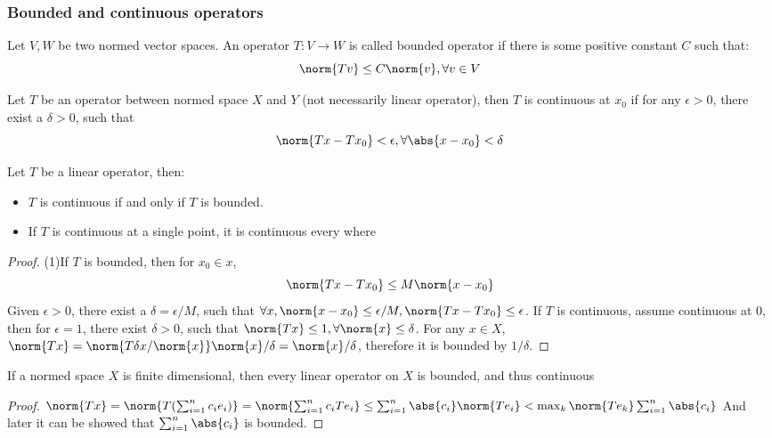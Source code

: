\begin{refsection}
\subsubsection{Bounded and continuous operators}
\begin{definition}
Let $V,W$ be two normed vector spaces. An operator $T: V\rightarrow W$ is called bounded operator if there is some positive constant $C$ such that:
$$\norm{Tv} \leq C\norm{v},\forall v\in V$$
\end{definition}


\begin{definition}
Let $T$ be an operator between normed space $X$ and $Y$ (not necessarily linear operator), then $T$ is continuous at $x_0$ if for any $\epsilon > 0$, there exist a $\delta > 0$, such that 
$$\norm{Tx - Tx_0} < \epsilon, \forall \abs{x-x_0} <\delta$$
\end{definition}

\begin{theorem}
Let $T$ be a linear operator, then:
\begin{itemize}
    \item $T$ is continuous if and only if $T$ is bounded.
    \item If $T$ is continuous at a single point, it is continuous every where
\end{itemize}
\end{theorem}
\begin{proof}
(1)If $T$ is bounded, then for $x_0 \in x$, $$\norm{Tx-Tx_0} \leq M\norm{x-x_0}$$ Given $\epsilon > 0$, there exist a $\delta = \epsilon/M$, such that $\forall x, \norm{x-x_0} \leq \epsilon/M, \norm{Tx-Tx_0} \leq \epsilon$. If $T$ is continuous, assume continuous at $0$, then for $\epsilon = 1$, there exist $\delta > 0$, such that $\norm{Tx}\leq 1,\forall \norm{x}\leq \delta$. For any $x \in X$, $\norm{Tx} = \norm{T \delta x/\norm{x}} \norm{x}/\delta = \norm{x}/\delta$, therefore it is bounded by $1/\delta$.	
\end{proof}



\begin{theorem}\cite[96]{kreyszig1989introductory} If a normed space $X$ is finite dimensional, then every linear operator on $X$ is bounded, and thus continuous 
\end{theorem}
\begin{proof}
$\norm{Tx} = \norm{T(\sum_{i=1}^n c_i e_i)} = \norm{\sum_{i=1}^n c_i Te_i}\leq \sum_{i=1}^n\abs{c_i} \norm{Te_i} < \max_k \norm{Te_k} \sum_{i=1}^n \abs{c_i}$
And later it can be showed that $\sum_{i=1}^n \abs{c_i}$ is bounded. 	
\end{proof}


\end{refsection}
